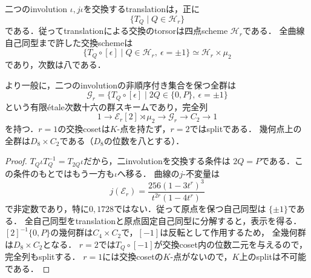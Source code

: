 \begin{proposition}
\label{prop:qa-boundary-pencil-exchange-torsor}
二つのinvolution $\iota,j\iota$を交換するtranslationは，正に
\[
 \{T_Q\mid Q\in\mathcal H_r\}
\]
である．従ってtranslationによる交換のtorsorは四点scheme $\mathcal H_r$である．
全曲線自己同型まで許した交換schemeは
\[
 \{T_Q\circ[\epsilon]\mid Q\in\mathcal H_r,\ \epsilon=\pm1\}
       \simeq\mathcal H_r\times\mu_2
\]
であり，次数は八である．

より一般に，二つのinvolutionの非順序付き集合を保つ全群は
\[
 \mathcal G_r=
 \{T_Q\circ[\epsilon]\mid 2Q\in\{0,P\},\ \epsilon=\pm1\}
\]
という有限\'etale次数十六の群スキームであり，完全列
\[
 1\longrightarrow\mathcal E_r[2]\rtimes\mu_2
 \longrightarrow\mathcal G_r\longrightarrow C_2\longrightarrow1
\]
を持つ．$r=1$の交換cosetは$K$-点を持たず，$r=2$ではsplitである．
幾何点上の全群は$D_8\times C_2$である（$D_8$の位数を八とする）．
\end{proposition}
\begin{proof}
$T_Q\iota T_Q^{-1}=T_{2Q}\iota$だから，二involutionを交換する条件は
$2Q=P$である．この条件のもとではもう一方も$\iota$へ移る．
曲線の$j$-不変量は
\[
 j(\mathcal E_r)=
 \frac{256(1-3t^r)^3}{t^{2r}(1-4t^r)}
\]
で非定数であり，特に$0,1728$ではない．従って原点を保つ自己同型は
$\{\pm1\}$である\cite[III, Theorem~10.1]{SilvermanAEC2009}．
全自己同型をtranslationと原点固定自己同型に分解すると，表示を得る．
$[2]^{-1}\{0,P\}$の幾何群は$C_4\times C_2$で，$[-1]$は反転として作用するため，
全幾何群は$D_8\times C_2$となる．
$r=2$では$T_Q\circ[-1]$が交換coset内の位数二元を与えるので，完全列もsplitする．
$r=1$には交換cosetの$K$-点がないので，$K$上のsplitは不可能である．
\end{proof}

